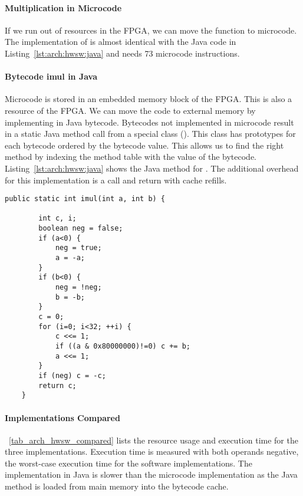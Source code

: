 \paragraph{Multiplication in Microcode}

If we run out of resources in the FPGA, we can move the function to
microcode. The implementation of  is almost identical
with the Java code in Listing~\ref{lst:arch:hwsw:java} and needs 73
microcode instructions.

\paragraph{Bytecode imul in Java}

Microcode is stored in an embedded memory block of the FPGA. This is
also a resource of the FPGA. We can move the code to external memory
by implementing  in Java bytecode. Bytecodes not
implemented in microcode result in a static Java method call from a
special class (). This class has
prototypes for each bytecode ordered by the bytecode value. This
allows us to find the right method by indexing the method table with
the value of the bytecode. Listing~\ref{lst:arch:hwsw:java} shows
the Java method for . The additional overhead for this
implementation is a call and return with cache refills.


\begin{lstlisting}[float, caption={Implementation of bytecode \code{imul} in Java},
label=lst:arch:hwsw:java]
    public static int imul(int a, int b) {

        int c, i;
        boolean neg = false;
        if (a<0) {
            neg = true;
            a = -a;
        }
        if (b<0) {
            neg = !neg;
            b = -b;
        }
        c = 0;
        for (i=0; i<32; ++i) {
            c <<= 1;
            if ((a & 0x80000000)!=0) c += b;
            a <<= 1;
        }
        if (neg) c = -c;
        return c;
    }
\end{lstlisting}

\paragraph{Implementations Compared}

\tablename~\ref{tab_arch_hwsw_compared} lists the resource usage and
execution time for the three implementations. Execution time is
measured with both operands negative, the worst-case execution time
for the software implementations. The implementation in Java is
slower than the microcode implementation as the Java method is
loaded from main memory into the bytecode cache.

